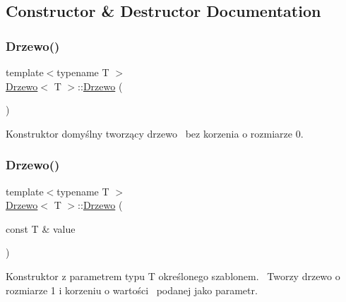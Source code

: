 \subsection{Constructor \& Destructor Documentation}
\mbox{\label{class_drzewo_a9b87f8101458fea6c866ffd01efa9ef6}} 
\subsubsection{\texorpdfstring{Drzewo()}{Drzewo()}\hspace{0.1cm}{\footnotesize\ttfamily [1/3]}}
{\footnotesize\ttfamily template$<$typename T $>$ \\
\hyperlink{class_drzewo}{Drzewo}$<$ T $>$\+::\hyperlink{class_drzewo}{Drzewo} (\begin{DoxyParamCaption}{ }\end{DoxyParamCaption})\hspace{0.3cm}{\ttfamily [inline]}}

Konstruktor domyślny tworzący drzewo~\newline
bez korzenia o rozmiarze 0.~\newline
\mbox{\label{class_drzewo_aca8b3e3da416a8e0221c1199ceb579c8}} 
\subsubsection{\texorpdfstring{Drzewo()}{Drzewo()}\hspace{0.1cm}{\footnotesize\ttfamily [2/3]}}
{\footnotesize\ttfamily template$<$typename T $>$ \\
\hyperlink{class_drzewo}{Drzewo}$<$ T $>$\+::\hyperlink{class_drzewo}{Drzewo} (\begin{DoxyParamCaption}\item[{const T \&}]{value }\end{DoxyParamCaption})\hspace{0.3cm}{\ttfamily [inline]}}

Konstruktor z parametrem typu T określonego szablonem.~\newline
Tworzy drzewo o rozmiarze 1 i korzeniu o wartości~\newline
podanej jako parametr. \mbox{\label{class_drzewo_a88fdcfad4e56e0053e34d493f656f61f}} 
